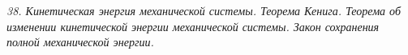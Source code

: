 \emph{38. Кинетическая энергия механической системы. Теорема Кенига. Теорема об
изменении кинетической энергии механической системы. Закон сохранения
полной механической энергии.}

\newpage
